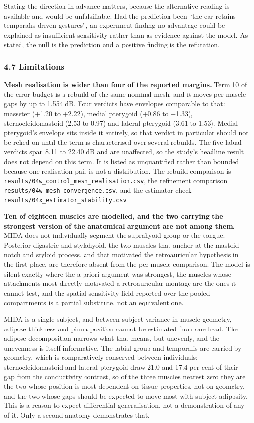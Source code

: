 \documentclass[
  11pt,
  a4paper,
]{article}
\begin{document}
Stating the direction in advance matters, because the alternative reading is
available and would be unfalsifiable. Had the prediction been ``the ear retains
temporalis-driven gestures'', an experiment finding no advantage could be
explained as insufficient sensitivity rather than as evidence against the model.
As stated, the null is the prediction and a positive finding is the refutation.

\subsubsection{4.7 Limitations}\label{limitations}

\textbf{Mesh realisation is wider than four of the reported margins.} Term 10 of the
error budget is a rebuild of the same nominal mesh, and it moves per-muscle gaps
by up to 1.554 dB. Four verdicts have envelopes comparable to that: masseter
(+1.20 to +2.22), medial pterygoid (+0.86 to +1.33), sternocleidomastoid (\textminus{}2.53
to \textminus{}0.97) and lateral pterygoid (\textminus{}3.61 to \textminus{}1.53). Medial pterygoid's envelope
sits inside it entirely, so that verdict in particular should not be relied on
until the term is characterised over several rebuilds. The five labial verdicts
span 8.11 to 22.40 dB and are unaffected, so the study's headline result does
not depend on this term. It is listed as unquantified rather than bounded
because one realisation pair is not a distribution. The rebuild comparison is
\texttt{results/04w\_control\_mesh\_realisation.csv}, the refinement comparison
\texttt{results/04w\_mesh\_convergence.csv}, and the estimator check
\texttt{results/04x\_estimator\_stability.csv}.

\textbf{Ten of eighteen muscles are modelled, and the two carrying the strongest
version of the anatomical argument are not among them.} MIDA does not
individually segment the suprahyoid group or the tongue. Posterior digastric and
stylohyoid, the two muscles that anchor at the mastoid notch and styloid
process, and that motivated the retroauricular hypothesis in the first place,
are therefore absent from the per-muscle comparison. The model is silent exactly
where the a-priori argument was strongest, the muscles whose attachments most
directly motivated a retroauricular montage are the ones it cannot test, and the
spatial sensitivity field reported over the pooled compartments is a partial
substitute, not an equivalent one.

MIDA is a single subject, and between-subject variance in muscle geometry,
adipose thickness and pinna position cannot be estimated from one head. The
adipose decomposition narrows what that means, but unevenly, and the unevenness
is itself informative. The labial group and temporalis are carried by geometry,
which is comparatively conserved between individuals; sternocleidomastoid and
lateral pterygoid draw 21.0 and 17.4 per cent of their gap from the conductivity
contrast, so of the three muscles nearest zero they are the two whose position
is most dependent on tissue properties, not on geometry, and the two whose gaps
should be expected to move most with subject adiposity. This is a reason to
expect differential generalisation, not a demonstration of any of it. Only a
second anatomy demonstrates that.
\end{document}
